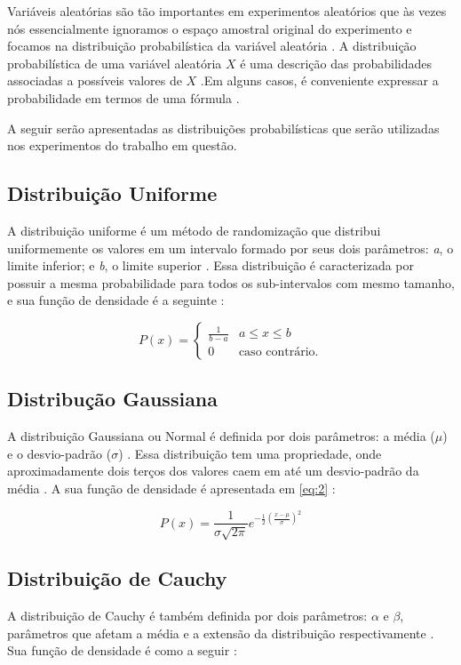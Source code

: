 Variáveis aleatórias são tão importantes em experimentos aleatórios que às vezes nós essencialmente ignoramos o espaço amostral original do experimento e focamos na distribuição probabilística da variável aleatória \cite{montgomery}. A distribuição probabilística de uma variável aleatória $X$ é uma descrição das probabilidades
associadas a possíveis valores de $X$ \cite{montgomery}.Em alguns casos, é conveniente expressar a probabilidade em termos de uma fórmula \cite{montgomery}.

A seguir serão apresentadas as distribuições probabilísticas que serão utilizadas nos experimentos do trabalho em questão.

\subsection{Distribuição Uniforme}
A distribuição uniforme é um método de randomização que distribui uniformemente os valores em um intervalo formado por seus dois parâmetros: \textit{a}, o limite inferior; e \textit{b}, o limite superior \cite{fister}. Essa distribuição é caracterizada por possuir a mesma probabilidade para todos os sub-intervalos com mesmo tamanho, e sua função de densidade é a seguinte \cite{fister}:

\begin{equation}
P(x) = 
\begin{cases}
	\frac{1}{b - a}    & \text{$a \leq x \leq b$}\\
    0 & \text{caso contrário.}
\end{cases}
\end{equation}

\subsection{Distribução Gaussiana}
A distribuição Gaussiana ou Normal é definida por dois parâmetros: a média ($\mu$) e o desvio-padrão ($\sigma$) \cite{fister}. Essa distribuição tem uma propriedade, onde aproximadamente dois terços dos valores caem em até um desvio-padrão da média \cite{fister}. A sua função de densidade é apresentada em \ref{eq:2} \cite{fister}:

\begin{equation}
\label{eq:2}
P(x) = \frac{1}{\sigma \sqrt{2\pi}}e^{-\frac{1}{2}(\frac{x - \mu}{\sigma})^2}
\end{equation}


\subsection{Distribuição de Cauchy}
A distribuição de Cauchy é também definida por dois parâmetros: $\alpha$ e $\beta$, parâmetros que afetam a média e a extensão da distribuição respectivamente \cite{thomsen}. Sua função de densidade é como a seguir \cite{thomsen}:

